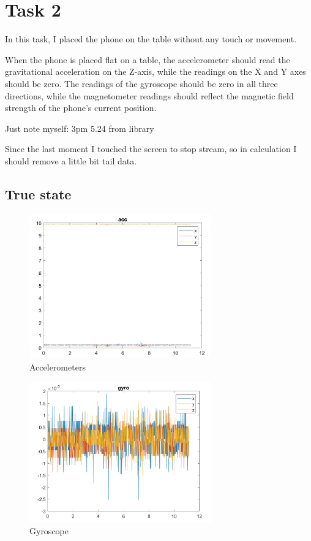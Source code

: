 \section{Task 2}

In this task, I placed the phone on the table without any touch or movement. 

When the phone is placed flat on a table, the accelerometer should read the gravitational acceleration on the Z-axis, while the readings on the X and Y axes should be zero.
The readings of the gyroscope should be zero in all three directions, while the magnetometer readings should reflect the magnetic field strength of the phone's current position.

Just note myself: 3pm 5.24 from library

Since the last moment I touched the screen to stop stream, so in calculation I should remove a little bit tail data.

\subsection{True state}

\begin{figure}[H]
 \centering
 \includegraphics[width=0.7\textwidth]{images/acc.png}
 \caption{Accelerometers}
 \label{acc}
\end{figure}

\begin{figure}[H]
 \centering
 \includegraphics[width=0.7\textwidth]{images/gyroscope.png}
 \caption{Gyroscope}
 \label{gyro}
\end{figure}

